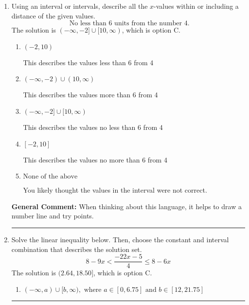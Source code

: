 \documentclass{extbook}[14pt]
\newcommand{\litem}[1]{\item #1

\rule{\textwidth}{0.4pt}}
\begin{document}
\begin{enumerate}
{\begin{enumerate}[label=\Alph*.]
Corresponds to including the endpoints (when they should be excluded).
\item \( (-\infty, a] \cup [b, \infty), \text{ where } a \in [-9.3, -7.95] \text{ and } b \in [5.02, 7.42] \)

Corresponds to including the endpoints AND negating.
\item \( (-\infty, a) \cup (b, \infty), \text{ where } a \in [-8.81, -7.65] \text{ and } b \in [6.46, 7.14] \)

Corresponds to inverting the inequality and negating the solution.
\item \( (-\infty, a) \cup (b, \infty), \text{ where } a \in [-7.34, -6.47] \text{ and } b \in [7.07, 8.38] \)

 * Correct option.
\item \( (-\infty, \infty) \)

Corresponds to the variable canceling, which does not happen in this instance.
\end{enumerate}

\textbf{General Comment:} When multiplying or dividing by a negative, flip the sign.
}
\litem{
Using an interval or intervals, describe all the $x$-values within or including a distance of the given values.
\[ \text{ No less than } 6 \text{ units from the number } 4. \]The solution is \( (-\infty, -2] \cup [10, \infty) \), which is option C.\begin{enumerate}[label=\Alph*.]
\item \( (-2, 10) \)

This describes the values less than 6 from 4
\item \( (-\infty, -2) \cup (10, \infty) \)

This describes the values more than 6 from 4
\item \( (-\infty, -2] \cup [10, \infty) \)

This describes the values no less than 6 from 4
\item \( [-2, 10] \)

This describes the values no more than 6 from 4
\item \( \text{None of the above} \)

You likely thought the values in the interval were not correct.
\end{enumerate}

\textbf{General Comment:} When thinking about this language, it helps to draw a number line and try points.
}
\litem{
Solve the linear inequality below. Then, choose the constant and interval combination that describes the solution set.
\[ 8 - 9 x < \frac{-22 x - 5}{4} \leq 8 - 6 x \]The solution is \( (2.64, 18.50] \), which is option C.\begin{enumerate}[label=\Alph*.]
\item \( (-\infty, a) \cup [b, \infty), \text{ where } a \in [0, 6.75] \text{ and } b \in [12, 21.75] \)


\end{enumerate}}
\end{enumerate}
\end{document}
